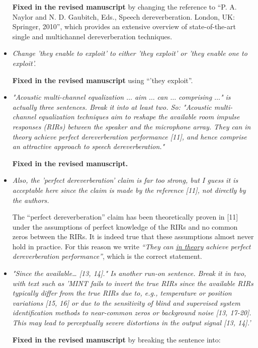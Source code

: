 \documentclass[10pt, a4paper]{article}
\begin{document}
\begin{itemize}
{\textbf{Fixed in the revised manuscript}} by changing the reference to ``P. A. Naylor and N. D. Gaubitch, Eds., Speech dereverberation. London, UK: Springer, 2010'', which provides an extensive overview of state-of-the-art single and multichannel dereverberation techniques.

\item {\textit{Change 'they enable to exploit' to either 'they exploit' or 'they enable one to exploit'.}}

{\textbf{Fixed in the revised manuscript}} using ``'they exploit''.

\item {\textit{"Acoustic multi-channel equalization $\ldots$ aim  $\ldots$ can $\ldots$ comprising $\ldots$" is actually three sentences. Break it into at least two. So: 
"Acoustic multi-channel equalization techniques aim to reshape the available room impulse responses (RIRs) between the speaker and the microphone array. They can in theory achieve perfect dereverberation performance [11], and hence comprise an attractive approach to speech dereverberation."
}}

{\textbf{Fixed in the revised manuscript.}}

\item {\textit{Also, the 'perfect dereverberation' claim is far too strong, but I guess it is acceptable here since the claim is made by the reference [11], not directly by the authors.}}

The ``perfect dereverberation'' claim has been theoretically proven in [11] under the assumptions of perfect knowledge of the RIRs and no common zeros between the RIRs. 
It is indeed true that these assumptions almost never hold in practice.
For this reason we write {\emph{``They can \underline{in theory} achieve perfect dereverberation performance''}}, which is the correct statement.

\item {\textit{"Since the available… [13, 14]." Is another run-on sentence. Break it in two, with text such as 'MINT fails to invert the true RIRs since the available RIRs typically differ from the true RIRs due to, e.g., temperature or position variations [15, 16] or due to the sensitivity of blind and supervised system identification methods to near-common zeros or background noise [13, 17-20]. This may lead to perceptually severe distortions in the output signal [13, 14].'}}

{\textbf{Fixed in the revised manuscript}} by breaking the sentence into:


\end{itemize}
\end{document}
